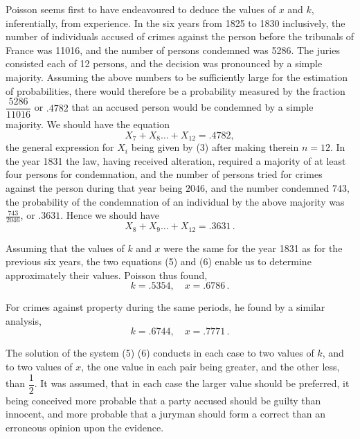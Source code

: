 \documentclass[oneside]{book}
\begin{document}
Poisson seems first to have endeavoured to deduce the values
of $x$ and $k$, inferentially, from experience. In the six years from
1825 to 1830 inclusively, the number of individuals accused of
crimes against the person before the tribunals of France was
11016, and the number of persons condemned was 5286. The
juries consisted each of 12 persons, and the decision was pronounced by a simple majority. Assuming the above numbers
to be sufficiently large for the estimation of probabilities, there
would therefore be a probability measured by the fraction $\dfrac{5286}{11016}$
or $.4782$ that an accused person would be condemned by a simple
majority. We should have the equation
\[
  X_7 + X_8 \dotsc + X_{12} = .4782,    \tag{5}
\]
the general expression for $X_i$ being given by (3) after making
therein $n = 12$. In the year 1831 the law, having received alteration, required a majority of at least four persons for condemnation, and the number of persons tried for crimes against the
person during that year being $2046$, and the number condemned
$743$, the probability of the condemnation of an individual by the
above majority was $\frac{743}{2046}$, or $.3631$. Hence we should have
\[
  X_8 + X_9 \dotsc + X_{12} = .3631\,.    \tag{6}
\]

Assuming that the values of $k$ and $x$ were the same for the
year 1831 as for the previous six years, the two equations (5) and
(6) enable us to determine approximately their values. Poisson
thus found,
\[
  k =.5354,\quad x =.6786\,.
\]

For crimes against property during the same periods, he
found by a similar analysis,
\[
  k =.6744,\quad x = .7771\,.
\]

The solution of the system (5) (6) conducts in each case to
two values of $k$, and to two values of $x$, the one value in each
pair being greater, and the other less, than $\dfrac{1}{2}$. It was assumed,
that in each case the larger value should be preferred, it being
conceived more probable that a party accused should be guilty
than innocent, and more probable that a juryman should form
a correct than an erroneous opinion upon the evidence.
\end{document}
